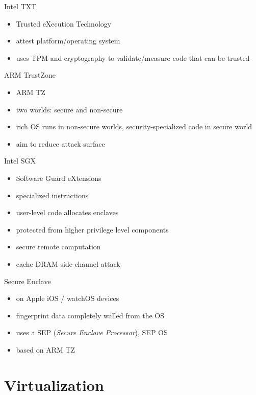 \documentclass{curs}
\begin{document}
\begin{frame}{Intel TXT}
  \begin{itemize}
    \item Trusted eXecution Technology
    \item attest platform/operating system
    \item uses TPM and cryptography to validate/measure code that can be trusted
  \end{itemize}
\end{frame}

\begin{frame}{ARM TrustZone}
  \begin{itemize}
    \item ARM TZ
    \item two worlds: secure and non-secure
    \item rich OS runs in non-secure worlds, security-specialized code in secure world
    \item aim to reduce attack surface
  \end{itemize}
\end{frame}

\begin{frame}{Intel SGX}
  \begin{itemize}
    \item Software Guard eXtensions
    \item specialized instructions
    \item user-level code allocates enclaves
    \item protected from higher privilege level components
    \item secure remote computation
    \item cache DRAM side-channel attack
  \end{itemize}
\end{frame}

\begin{frame}{Secure Enclave}
  \begin{itemize}
    \item on Apple iOS / watchOS devices
    \item fingerprint data completely walled from the OS
    \item uses a SEP (\textit{Secure Enclave Processor}), SEP OS
    \item based on ARM TZ
  \end{itemize}
\end{frame}

\section{Virtualization}
\end{document}
